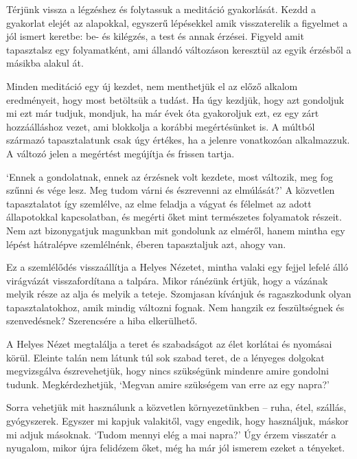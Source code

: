 
\noindent Térjünk vissza a légzéshez és folytassuk a meditáció
gyakorlását. Kezdd a gyakorlat elejét az alapokkal, egyszerű lépésekkel
amik visszaterelik a figyelmet a jól ismert keretbe: be- és kilégzés, a
test és annak érzései. Figyeld amit tapasztalsz egy folyamatként, ami
állandó változáson keresztül az egyik érzésből a másikba alakul át.

Minden meditáció egy új kezdet, nem menthetjük el az előző alkalom
eredményeit, hogy most betöltsük a tudást. Ha úgy kezdjük, hogy azt
gondoljuk mi ezt már tudjuk, mondjuk, ha már évek óta gyakoroljuk ezt,
ez egy zárt hozzáálláshoz vezet, ami blokkolja a korábbi megértésünket
is. A múltból származó tapasztalatunk csak úgy értékes, ha a jelenre
vonatkozóan alkalmazzuk. A változó jelen a megértést megújítja és
frissen tartja.

`Ennek a gondolatnak, ennek az érzésnek volt kezdete, most változik, meg
fog szűnni és vége lesz. Meg tudom várni és észrevenni az elmúlását?' A
közvetlen tapasztalatot így szemlélve, az elme feladja a vágyat és
félelmet az adott állapotokkal kapcsolatban, és megérti őket mint
természetes folyamatok részeit. Nem azt bizonygatjuk magunkban mit
gondolunk az elméről, hanem mintha egy lépést hátralépve szemlélnénk,
éberen tapasztaljuk azt, ahogy van.

Ez a szemlélődés visszaállítja a Helyes Nézetet, mintha valaki egy
fejjel lefelé álló virágvázát visszafordítana a talpára. Mikor ránézünk
értjük, hogy a vázának melyik része az alja és melyik a teteje.
Szomjasan kívánjuk és ragaszkodunk olyan tapasztalatokhoz, amik mindig
változni fognak. Nem hangzik ez feszültségnek és szenvedésnek?
Szerencsére a hiba elkerülhető.


A Helyes Nézet megtalálja a teret és szabadságot az élet korlátai és
nyomásai körül. Eleinte talán nem látunk túl sok szabad teret, de a
lényeges dolgokat megvizsgálva észrevehetjük, hogy nincs szükségünk
mindenre amire gondolni tudunk. Megkérdezhetjük, `Megvan amire szükségem
van erre az egy napra?'

Sorra vehetjük mit használunk a közvetlen környezetünkben -- ruha, étel,
szállás, gyógyszerek. Egyszer mi kapjuk valakitől, vagy engedik, hogy
használjuk, máskor mi adjuk másoknak. `Tudom mennyi elég a mai napra?'
Úgy érzem visszatér a nyugalom, mikor újra felidézem őket, még ha már
jól ismerem ezeket a tényeket.

